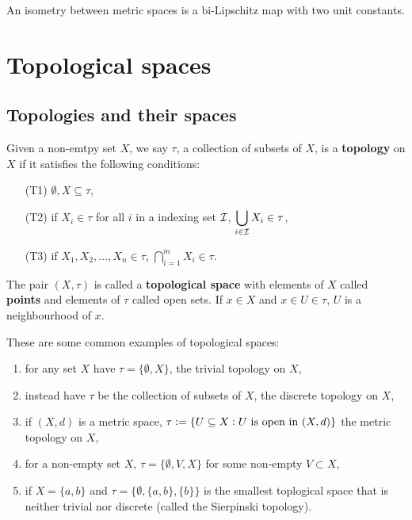 \documentclass[../Year2.tex]{subfiles}
\begin{document}
\begin{remark}
    An isometry between metric spaces is a bi-Lipschitz map with two unit constants.
\end{remark}

\section{Topological spaces}

\subsection{Topologies and their spaces}

\begin{definition}[Topology]
    Given a non-emtpy set $X$, we say $\tau$, a collection of subsets of $X$, is a \textbf{topology} on $X$ if it satisfies the following conditions: \begin{enumerate}
        \item[(T1)] $\emptyset,X\subseteq\tau$,
        \item[(T2)] if $X_i\in\tau$ for all $i$ in a indexing set $\mathcal{I}$, $\displaystyle \bigcup_{i\in\mathcal{I}}X_i\in\tau$,
        \vspace{-10pt}
        \item[(T3)] if $X_1,X_2,\ldots,X_n\in\tau$, $\displaystyle \bigcap_{i=1}^m X_i\in\tau$.
    \end{enumerate}
    The pair $(X,\tau)$ is called a \textbf{topological space} with elements of $X$ called \textbf{points} and elements of $\tau$ called open sets. If $x\in X$ and $x\in U\in\tau$, $U$ is a neighbourhood of $x$.
\end{definition}

\begin{examples}
    These are some common examples of topological spaces: \begin{enumerate}
        \item for any set $X$ have $\tau=\{\emptyset, X\}$, the trivial topology on $X$,
        \item instead have $\tau$ be the collection of subsets of $X$, the discrete topology on $X$,
        \item if $(X,d)$ is a metric space, $\tau:=\{U\subseteq X: U \ \black{is open in } (X,d)\}$ the metric topology on $X$,
        \item for a non-empty set $X$, $\tau=\{\emptyset,V,X\}$ for some non-empty $V\subset X$,
        \item if $X=\{a,b\}$ and $\tau=\{\emptyset,\{a,b\},\{b\}\}$ is the smallest toplogical space that is neither trivial nor discrete (called the Sierpinski topology).
    \end{enumerate}
\end{examples}
\end{document}
